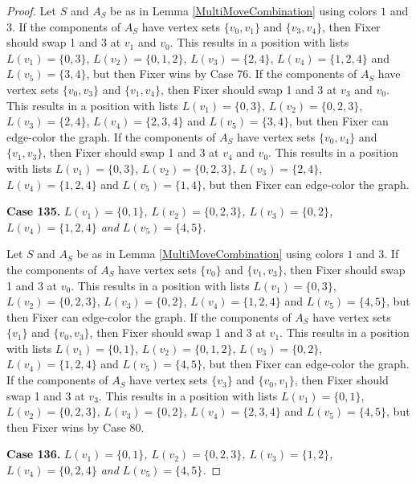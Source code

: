 \documentclass[12pt]{amsart}
\theoremstyle{plain}
\theoremstyle{definition}
\theoremstyle{remark}
\begin{document}
\begin{proof}
Let $S$ and $A_S$ be as in Lemma \ref{MultiMoveCombination} using colors $1$ and $3$. If the components of $A_S$ have vertex sets $\{v_0, v_1\}$ and $\{v_3, v_4\}$, then Fixer should swap 1 and 3 at $v_1$ and $v_0$. This results in a position with lists $L(v_1) = \{0, 3\}$, $L(v_2) = \{0, 1, 2\}$, $L(v_3) = \{2, 4\}$, $L(v_4) = \{1, 2, 4\}$ and $L(v_5) = \{3, 4\}$, but then Fixer wins by Case 76.
If the components of $A_S$ have vertex sets $\{v_0, v_3\}$ and $\{v_1, v_4\}$, then Fixer should swap 1 and 3 at $v_3$ and $v_0$. This results in a position with lists $L(v_1) = \{0, 3\}$, $L(v_2) = \{0, 2, 3\}$, $L(v_3) = \{2, 4\}$, $L(v_4) = \{2, 3, 4\}$ and $L(v_5) = \{3, 4\}$, but then Fixer can edge-color the graph.
If the components of $A_S$ have vertex sets $\{v_0, v_4\}$ and $\{v_1, v_3\}$, then Fixer should swap 1 and 3 at $v_4$ and $v_0$. This results in a position with lists $L(v_1) = \{0, 3\}$, $L(v_2) = \{0, 2, 3\}$, $L(v_3) = \{2, 4\}$, $L(v_4) = \{1, 2, 4\}$ and $L(v_5) = \{1, 4\}$, but then Fixer can edge-color the graph.

\noindent\textbf{Case 135.  }\textit{$L(v_1) = \{0, 1\}$, $L(v_2) = \{0, 2, 3\}$, $L(v_3) = \{0, 2\}$, $L(v_4) = \{1, 2, 4\}$ and $L(v_5) = \{4, 5\}$.}

Let $S$ and $A_S$ be as in Lemma \ref{MultiMoveCombination} using colors $1$ and $3$. If the components of $A_S$ have vertex sets $\{v_0\}$ and $\{v_1, v_3\}$, then Fixer should swap 1 and 3 at $v_0$. This results in a position with lists $L(v_1) = \{0, 3\}$, $L(v_2) = \{0, 2, 3\}$, $L(v_3) = \{0, 2\}$, $L(v_4) = \{1, 2, 4\}$ and $L(v_5) = \{4, 5\}$, but then Fixer can edge-color the graph.
If the components of $A_S$ have vertex sets $\{v_1\}$ and $\{v_0, v_3\}$, then Fixer should swap 1 and 3 at $v_1$. This results in a position with lists $L(v_1) = \{0, 1\}$, $L(v_2) = \{0, 1, 2\}$, $L(v_3) = \{0, 2\}$, $L(v_4) = \{1, 2, 4\}$ and $L(v_5) = \{4, 5\}$, but then Fixer can edge-color the graph.
If the components of $A_S$ have vertex sets $\{v_3\}$ and $\{v_0, v_1\}$, then Fixer should swap 1 and 3 at $v_3$. This results in a position with lists $L(v_1) = \{0, 1\}$, $L(v_2) = \{0, 2, 3\}$, $L(v_3) = \{0, 2\}$, $L(v_4) = \{2, 3, 4\}$ and $L(v_5) = \{4, 5\}$, but then Fixer wins by Case 80.

\noindent\textbf{Case 136.  }\textit{$L(v_1) = \{0, 1\}$, $L(v_2) = \{0, 2, 3\}$, $L(v_3) = \{1, 2\}$, $L(v_4) = \{0, 2, 4\}$ and $L(v_5) = \{4, 5\}$.}


\end{proof}
\end{document}

